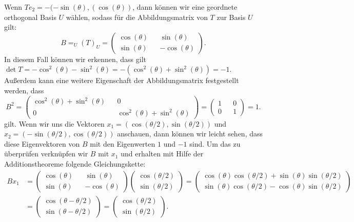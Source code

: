 Wenn $Te_2 = - (-\sin(\theta),(\cos(\theta))$, dann können wir eine geordnete orthogonal Basis $U$ wählen, sodass für die Abbildungsmatrix von $T$ zur Basis $U$ gilt:
$$B = _U(T)_U = \begin{pmatrix}
	\cos(\theta) && \sin(\theta) \\
	\sin(\theta) && -\cos(\theta)
\end{pmatrix}.$$
In diesem Fall können wir erkennen, dass gilt $\det T = -\cos^2(\theta) -\sin^2(\theta) = -(\cos^2(\theta) +\sin^2(\theta)) = -1$. Außerdem kann eine weitere Eigenschaft der Abbildungsmatrix festgestellt werden, dass
$$B^2 = \begin{pmatrix}
	\cos^2(\theta) + \sin^2(\theta) && 0 \\
	0 && \cos^2(\theta) + \sin^2(\theta)
\end{pmatrix} = \begin{pmatrix}
	1 && 0 \\
	0 && 1 
\end{pmatrix} = 1.
$$ gilt. Wenn wir uns die Vektoren $x_1 = (\cos(\theta/2),\sin(\theta/2))$ und $x_2 = (-\sin(\theta/2),\cos(\theta/2))$ anschauen, dann können wir leicht sehen, dass diese Eigenvektoren von $B$ mit den Eigenwerten $1$ und $-1$ sind. Um das zu überprüfen verknüpfen wir $B$ mit $x_1$ und erhalten mit Hilfe der Additionstheoreme folgende Gleichungskette:
\begin{align*}
	Bx_1 &= \begin{pmatrix}
		\cos(\theta) && \sin(\theta) \\
		\sin(\theta) && -\cos(\theta)
	\end{pmatrix} \begin{pmatrix}
		\cos(\theta/2) \\
		\sin(\theta/2)
	\end{pmatrix} = \begin{pmatrix}
		\cos(\theta)\cos(\theta/2)+\sin(\theta)\sin(\theta/2) \\
		\sin(\theta)\cos(\theta/2)-\cos(\theta)\sin(\theta/2)
	\end{pmatrix} \\ &= \begin{pmatrix}
		\cos(\theta - \theta/2) \\
		\sin(\theta - \theta/2)
	\end{pmatrix} = \begin{pmatrix}
		\cos(\theta/2) \\
		\sin(\theta/2)
	\end{pmatrix}.
\end{align*}
